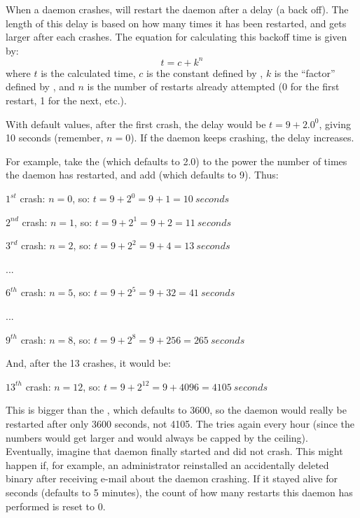 When a daemon crashes,  will restart the daemon after a
delay (a back off).
The length of this delay is based on how many times it has been
restarted, and gets larger after each crashes. 
The equation for calculating this backoff time is
given by: $$t = c + k^n$$ where $t$ is the calculated time, $c$ is
the constant defined by , $k$ is
the ``factor'' defined by , and $n$
is the number of restarts already attempted (0 for the first restart,
1 for the next, etc.).

With default values, after the first crash, the delay would be $t = 9
+ 2.0^0$, giving 10 seconds (remember, $n = 0$).  If the daemon keeps
crashing, the delay increases.

For example, take the  (which defaults
to 2.0) to the power the number of times the daemon has restarted, and add
 (which defaults to 9).
Thus:

 $1^{st}$ crash:  $n = 0$, so: $t = 9 + 2^0 = 9 + 1 = 10\ seconds$

 $2^{nd}$ crash:  $n = 1$, so: $t = 9 + 2^1 = 9 + 2 = 11\ seconds$

 $3^{rd}$ crash:  $n = 2$, so: $t = 9 + 2^2 = 9 + 4 = 13\ seconds$

    ...

 $6^{th}$ crash:  $n = 5$, so: $t = 9 + 2^5 = 9 + 32 = 41\ seconds$

    ...

 $9^{th}$ crash:  $n = 8$, so: $t = 9 + 2^8 = 9 + 256 = 265\ seconds$

And, after the 13 crashes, it would be:

 $13^{th}$ crash:  $n = 12$, so: $t = 9 + 2^{12} = 9 + 4096 = 4105\ seconds$

This is bigger than the , which
defaults to 3600, so the daemon would really be restarted after only
3600 seconds, not 4105.
The  tries again every hour (since the numbers would
get larger and would always be capped by the ceiling).
Eventually, imagine that daemon finally started and did not crash.
This might happen if, for example, an administrator reinstalled
an accidentally deleted binary after receiving e-mail about
the daemon crashing.
If it stayed alive for
 seconds (defaults to 5 minutes),
the count of how many restarts this daemon has performed is reset to
0.

